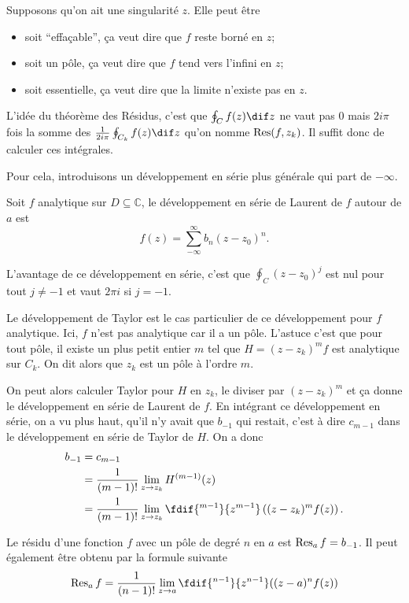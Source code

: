 Supposons qu'on ait une singularité $z$.
Elle peut être
\begin{itemize}
  \item soit ``effaçable'', ça veut dire que $f$ reste borné en $z$;
  \item soit un pôle, ça veut dire que $f$ tend vers l'infini en $z$;
  \item soit essentielle, ça veut dire que la limite n'existe pas en $z$.
\end{itemize}

L'idée du théorème des Résidus, c'est que $\oint_C f(z) \dif z$ ne vaut
pas 0 mais $2i\pi$ fois la somme des
$\frac{1}{2i\pi} \oint_{C_k} f(z) \dif z$ qu'on
nomme $\operatorname{Res}(f, z_k)$.
Il suffit donc de calculer ces intégrales.

Pour cela, introduisons un développement en série plus générale qui
part de $-\infty$.
\begin{mydef}
  Soit $f$ analytique sur $D \subseteq \mathbb{C}$,
  le développement en série de Laurent de $f$ autour de $a$ est
  \[ f(z) = \sum_{-\infty}^{\infty}b_n(z-z_0)^n. \]
\end{mydef}
L'avantage de ce développement en série, c'est que
$\oint_C (z-z_0)^j$ est nul pour tout $j \neq -1$ et vaut $2\pi i$ si
$j = -1$.

Le développement de Taylor est le cas particulier de ce développement
pour $f$ analytique.
Ici, $f$ n'est pas analytique car il a un pôle.
L'astuce c'est que pour tout pôle, il existe un plus petit entier
$m$ tel que $H = (z-z_k)^mf$ est analytique sur $C_k$.
On dit alors que $z_k$ est un pôle à l'ordre $m$.

On peut alors calculer Taylor pour $H$ en $z_k$,
le diviser par $(z-z_k)^m$ et ça donne le développement en série de Laurent
de $f$.
En intégrant ce développement en série, on a vu plus haut,
qu'il n'y avait que $b_{-1}$ qui restait,
c'est à dire $c_{m-1}$ dans le développement en série de Taylor de
$H$.
On a donc
\begin{align*}
  b_{-1} & = c_{m-1}\\
  & = \frac{1}{(m-1)!}\lim_{z\to z_k} H^{(m-1)}(z)\\
  & = \frac{1}{(m-1)!}\lim_{z\to z_k} \fdif{^{m-1}}{z^{m-1}}
  \left((z-z_k)^m f(z)\right).
\end{align*}

\begin{mydef}
  Le résidu d'une fonction $f$ avec un pôle de degré $n$ en $a$ est
  $\operatorname{Res}_a f = b_{-1}$.
  Il peut également être obtenu par la formule suivante
  \[ \res_a f = \frac{1}{(n-1)!} \lim_{z \to a}
  \fdif{^{n-1}}{z^{n-1}}((z-a)^nf(z)) \]
\end{mydef}

